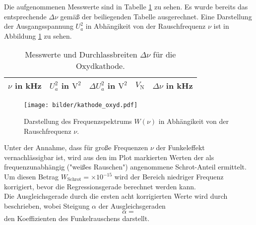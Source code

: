 	Die aufgenommenen Messwerte sind in Tabelle 
	\ref{tab:kathode_oxyd} zu sehen. Es wurde bereits das 
	entsprechende $\Delta \nu$ gemäß der beiliegenden Tabelle 
	ausgerechnet. Eine Darstellung der Ausgangsspannung $U_a^2$ in 
	Abhängikeit von der Rauschfrequenz $\nu$ ist in Abbildung 
	\ref{fig:kathode_oxyd} zu sehen.
	\begin{table}
		\centering
		\begin{tabular}{ccccc}
		\toprule \midrule
		$\nu$ in kHz & $U_a^2$ in $\text{V}^2$& $\Delta U_a^2$ in   
		$\text{V}^2$& $V_\text{N}$ & $\Delta \nu$ in kHz\\
		\midrule
		
		\midrule
		\bottomrule
		\end{tabular}
		\caption{Messwerte und Durchlassbreiten $\Delta \nu$ für 
		die Oxydkathode.}
		\label{tab:kathode_oxyd}
	\end{table}

	\begin{figure}
		\centering
		\texttt{[image: bilder/kathode\_oxyd.pdf]}
		\caption{Darstellung des Frequenzspektrums $W(\nu)$ in 
		Abhängikeit von der Rauschfrequenz $\nu$.}
		\label{fig:kathode_oxyd}
	\end{figure}
	
	Unter der Annahme, dass für große Frequenzen $\nu$ der Funkeleffekt 
	vernachlässigbar ist, wird aus den im Plot markierten Werten der als 
	frequenzunabhängig ("weißes Rauschen") angenommene Schrot-Anteil ermittelt. 
	Um diesen Betrag $W_\text{Schrot}=\times 
	10^{-15}$ wird der 
	Bereich niedriger Frequenz korrigiert, bevor die Regressionsgerade berechnet 
	werden kann.\\
	
	Die Ausgleichsgerade durch die ersten acht korrigierten Werte wird durch 
	\begin{equation}
	
	\end{equation}
	beschrieben, wobei Steigung $\alpha$ der Ausgleichsgeraden 
	\begin{equation}
	\alpha = 
	\end{equation}
	den Koeffizienten des Funkelrauschens darstellt.